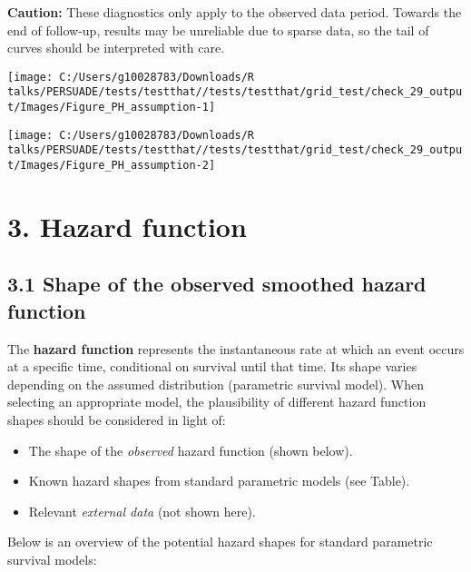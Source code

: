 \documentclass[
]{article}
\providecommand{\tightlist}{%
  \setlength{\itemsep}{0pt}\setlength{\parskip}{0pt}}
\begin{document}
\textbf{Caution:} These diagnostics only apply to the observed data
period. Towards the end of follow-up, results may be unreliable due to
sparse data, so the tail of curves should be interpreted with care.

\clearpage

\begin{flushleft}\texttt{[image: C:/Users/g10028783/Downloads/R talks/PERSUADE/tests/testthat//tests/testthat/grid\_test/check\_29\_output/Images/Figure\_PH\_assumption-1]} \end{flushleft}

\begin{flushleft}\texttt{[image: C:/Users/g10028783/Downloads/R talks/PERSUADE/tests/testthat//tests/testthat/grid\_test/check\_29\_output/Images/Figure\_PH\_assumption-2]} \end{flushleft}

\clearpage

\section{3. Hazard function}\label{hazard-function}

\subsection{3.1 Shape of the observed smoothed hazard
function}\label{shape-of-the-observed-smoothed-hazard-function}

The \textbf{hazard function} represents the instantaneous rate at which
an event occurs at a specific time, conditional on survival until that
time. Its shape varies depending on the assumed distribution (parametric
survival model). When selecting an appropriate model, the plausibility
of different hazard function shapes should be considered in light of:

\begin{itemize}
\tightlist
\item
  The shape of the \emph{observed} hazard function (shown below).
\item
  Known hazard shapes from standard parametric models (see Table).
\item
  Relevant \emph{external data} (not shown here).
\end{itemize}

Below is an overview of the potential hazard shapes for standard
parametric survival models:
\end{document}
